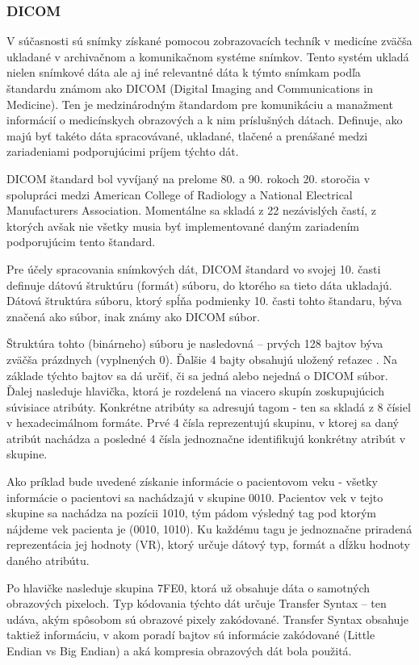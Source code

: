 \subsubsection {DICOM}\label{dicom}

V súčasnosti sú snímky získané pomocou zobrazovacích techník v medicíne zväčša ukladané v archivačnom a komunikačnom systéme snímkov. Tento systém ukladá nielen snímkové dáta ale aj iné relevantné dáta k týmto snímkam podľa štandardu známom ako DICOM (Digital Imaging and Communications in Medicine). Ten je medzinárodným štandardom pre komunikáciu a manažment informácií o medicínskych obrazových a k nim príslušných dátach. Definuje, ako majú byť takéto dáta spracovávané, ukladané, tlačené a prenášané medzi zariadeniami podporujúcimi príjem týchto dát.

DICOM štandard bol vyvíjaný na prelome 80. a 90. rokoch 20. storočia v spolupráci medzi American College of Radiology a National Electrical Manufacturers Association. Momentálne sa skladá z 22 nezávislých častí, z ktorých avšak nie všetky musia byť implementované daným zariadením podporujúcim tento štandard.

Pre účely spracovania snímkových dát, DICOM štandard vo svojej 10. časti definuje dátovú štruktúru (formát) súboru, do ktorého sa tieto dáta ukladajú. Dátová štruktúra súboru, ktorý spĺňa podmienky 10. časti tohto štandaru, býva značená ako  súbor, inak známy ako DICOM súbor.

Štruktúra tohto (binárneho) súboru je nasledovná -- prvých 128 bajtov býva zväčša prázdnych (vyplnených 0). Ďalšie 4 bajty obsahujú uložený reťazec .  Na základe týchto bajtov sa dá určiť, či sa jedná alebo nejedná o DICOM súbor.
Ďalej nasleduje hlavička, ktorá je rozdelená na viacero skupín zoskupujúcich súvisiace atribúty. Konkrétne atribúty sa adresujú tagom - ten sa skladá z 8 čísiel v hexadecimálnom formáte. Prvé 4 čísla reprezentujú skupinu, v ktorej sa daný atribút nachádza a posledné 4 čísla jednoznačne identifikujú konkrétny atribút v skupine.

Ako príklad bude uvedené získanie informácie o pacientovom veku - všetky informácie o pacientovi sa nachádzajú v skupine 0010. Pacientov vek v tejto skupine sa nachádza na pozícii 1010, tým pádom výsledný tag pod ktorým nájdeme vek pacienta je (0010, 1010). Ku každému tagu je jednoznačne priradená reprezentácia jej hodnoty (VR), ktorý určuje dátový typ, formát a dĺžku hodnoty daného atribútu.

Po hlavičke nasleduje skupina 7FE0, ktorá už obsahuje dáta o samotných obrazových pixeloch. Typ kódovania týchto dát určuje Transfer Syntax -- ten udáva, akým spôsobom sú obrazové pixely zakódované. Transfer Syntax obsahuje taktiež informáciu, v akom poradí bajtov sú informácie zakódované (Little Endian vs Big Endian) a aká kompresia obrazových dát bola použitá.

